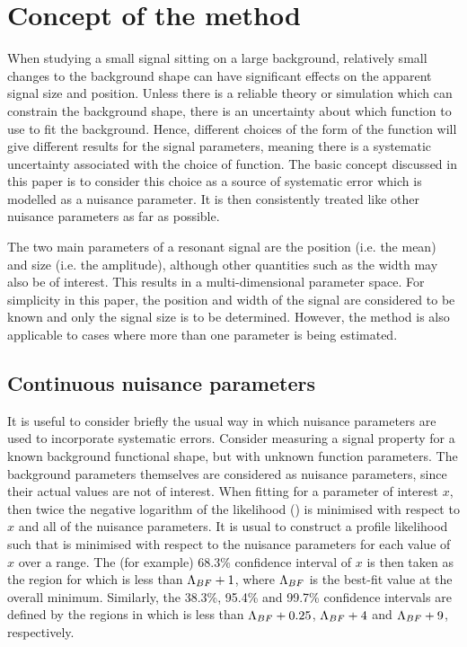 \section{Concept of the method} %
\label{sec:concept}

When studying a small signal sitting on
a large background, relatively small changes to the background shape can
have significant effects on the apparent signal size and position.
Unless there is a
reliable theory or simulation which can constrain the background shape,
there is an uncertainty about which function to use to fit
the background. Hence, different choices of the form of the function
will give different results for the signal parameters, meaning there is a
systematic uncertainty associated with the choice of function.
The basic concept discussed in this paper is to consider this choice
as a source of systematic error which is modelled as a nuisance parameter.
It is then consistently treated like other nuisance parameters as far as
possible.

The two main parameters of a resonant signal are the position (i.e. the mean)
and size (i.e. the amplitude), although other
quantities such as the width may also be of interest. This results in a
multi-dimensional parameter space. For simplicity in this paper, the position
and width of the signal are considered to be known and only the signal
size is to be determined. However, the method is also applicable to
cases where more than one parameter is being estimated.

\subsection{Continuous nuisance parameters}
\label{sec:concept:continuous}

It is useful to consider briefly the usual way in which nuisance
parameters are used to incorporate systematic errors. Consider measuring a signal
property for a known background functional shape, but with unknown function
parameters. The background parameters themselves are considered as
nuisance parameters, since their actual values are not of interest.
When fitting for a parameter of interest $x$, then twice the negative logarithm of the
likelihood (\nll) is minimised with respect to $x$ and all of the
nuisance parameters. It is usual to construct a profile likelihood
such that \nll is minimised with respect to the nuisance parameters
for each value of $x$ over a range.
The (for example) 68.3\% confidence interval of $x$
is then
taken as the region for which \nll is less than ${\rm \Lambda}_{BF}+1$,
where ${\rm \Lambda}_{BF}$ is the best-fit value at the overall minimum.
Similarly, the 38.3\%, 95.4\% and 99.7\% confidence intervals are defined by the
regions in which \nll is less than ${\rm \Lambda}_{BF}+0.25$, ${\rm \Lambda}_{BF}+4$
and ${\rm \Lambda}_{BF}+9$, respectively.

